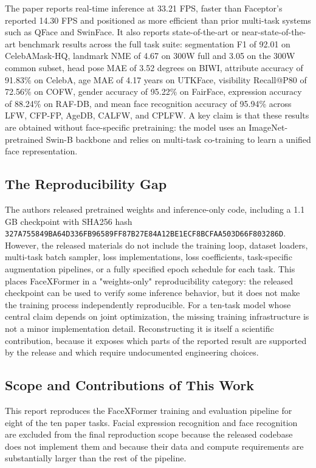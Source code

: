 \documentclass[11pt]{article}
\begin{document}
The paper reports real-time inference at 33.21 FPS, faster than Faceptor's reported 14.30 FPS and positioned as more efficient than prior multi-task systems such as QFace and SwinFace. It also reports state-of-the-art or near-state-of-the-art benchmark results across the full task suite: segmentation F1 of 92.01 on CelebAMask-HQ, landmark NME of 4.67 on 300W full and 3.05 on the 300W common subset, head pose MAE of 3.52 degrees on BIWI, attribute accuracy of 91.83\% on CelebA, age MAE of 4.17 years on UTKFace, visibility Recall@P80 of 72.56\% on COFW, gender accuracy of 95.22\% on FairFace, expression accuracy of 88.24\% on RAF-DB, and mean face recognition accuracy of 95.94\% across LFW, CFP-FP, AgeDB, CALFW, and CPLFW. A key claim is that these results are obtained without face-specific pretraining: the model uses an ImageNet-pretrained Swin-B backbone and relies on multi-task co-training to learn a unified face representation.


\subsection{The Reproducibility Gap}


The authors released pretrained weights and inference-only code, including a 1.1 GB checkpoint with SHA256 hash \texttt{327A755849BA64D3\allowbreak{}36FB96589FF87B27\allowbreak{}E84A12BE1ECF8BCF\allowbreak{}AA503D66F803286D}. However, the released materials do not include the training loop, dataset loaders, multi-task batch sampler, loss implementations, loss coefficients, task-specific augmentation pipelines, or a fully specified epoch schedule for each task. This places FaceXFormer in a "weights-only" reproducibility category: the released checkpoint can be used to verify some inference behavior, but it does not make the training process independently reproducible. For a ten-task model whose central claim depends on joint optimization, the missing training infrastructure is not a minor implementation detail. Reconstructing it is itself a scientific contribution, because it exposes which parts of the reported result are supported by the release and which require undocumented engineering choices.


\subsection{Scope and Contributions of This Work}


This report reproduces the FaceXFormer training and evaluation pipeline for eight of the ten paper tasks. Facial expression recognition and face recognition are excluded from the final reproduction scope because the released codebase does not implement them and because their data and compute requirements are substantially larger than the rest of the pipeline.
\end{document}
